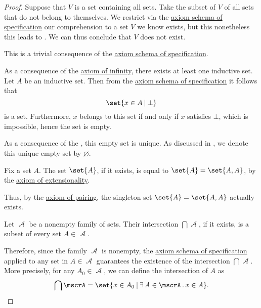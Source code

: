 \begin{proof}
   Suppose that \( V \) is a set containing all sets. Take the subset of \( V \) of all sets that do not belong to themselves. We restrict via the \hyperref[def:zfc/specification]{axiom schema of specification} our comprehension to a set \( V \) we know exists, but this nonetheless this leads to . We can thus conclude that \( V \) does not exist.

   This is a trivial consequence of the \hyperref[def:zfc/specification]{axiom schema of specification}.

   As a consequence of the \hyperref[def:zfc/infinity]{axiom of infinity}, there exists at least one inductive set. Let \( A \) be an inductive set. Then from the \hyperref[def:zfc/specification]{axiom schema of specification} it follows that
  \begin{equation*}
    \set{ x \in A \given \bot }
  \end{equation*}
  is a set. Furthermore, \( x \) belongs to this set if and only if \( x \) satisfies \( \bot \), which is impossible, hence the set is empty.

  As a consequence of the , this empty set is unique. As discussed in , we denote this unique empty set by \( \varnothing \).

   Fix a set \( A \). The set \( \set{A} \), if it exists, is equal to \( \set{A} = \set{A, A} \), by the \hyperref[def:zfc/extensionality]{axiom of extensionality}.

  Thus, by the \hyperref[def:zfc/pairing]{axiom of pairing}, the singleton set \( \set{A} = \set{A, A} \) actually exists.

   Let \( \mscrA \) be a nonempty family of sets. Their intersection \( \bigcap \mscrA \), if it exists, is a subset of every set \( A \in \mscrA \).

  Therefore, since the family \( \mscrA \) is nonempty, the \hyperref[def:zfc/specification]{axiom schema of specification} applied to any set in \( A \in \mscrA \) guarantees the existence of the intersection \( \bigcap \mscrA \). More precisely, for any \( A_0 \in \mscrA \), we can define the intersection of \( A \) as
  \begin{equation*}
    \bigcap \mscrA = \set{ x \in A_0 \given \qexists {A \in \mscrA} x \in A }.
  \end{equation*}


\end{proof}
